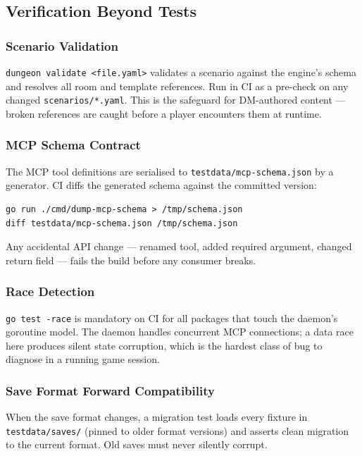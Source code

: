 \documentclass[a4paper,10pt]{article}
\newcommand{\cmd}[1]{\texttt{#1}}
\begin{document}
\subsection{Verification Beyond Tests}

\subsubsection{Scenario Validation}

\cmd{dungeon validate <file.yaml>} validates a scenario against the
engine's schema and resolves all room and template references.  Run
in CI as a pre-check on any changed \texttt{scenarios/*.yaml}.
This is the safeguard for DM-authored content --- broken references
are caught before a player encounters them at runtime.

\subsubsection{MCP Schema Contract}

The MCP tool definitions are serialised to
\texttt{testdata/mcp-schema.json} by a generator.  CI diffs the
generated schema against the committed version:

\begin{lstlisting}
go run ./cmd/dump-mcp-schema > /tmp/schema.json
diff testdata/mcp-schema.json /tmp/schema.json
\end{lstlisting}

Any accidental API change --- renamed tool, added required argument,
changed return field --- fails the build before any consumer breaks.

\subsubsection{Race Detection}

\texttt{go test -race} is mandatory on CI for all packages that
touch the daemon's goroutine model.  The daemon handles concurrent
MCP connections; a data race here produces silent state corruption,
which is the hardest class of bug to diagnose in a running game
session.

\subsubsection{Save Format Forward Compatibility}

When the save format changes, a migration test loads every fixture
in \texttt{testdata/saves/} (pinned to older format versions) and
asserts clean migration to the current format.  Old saves must
never silently corrupt.
\end{document}
